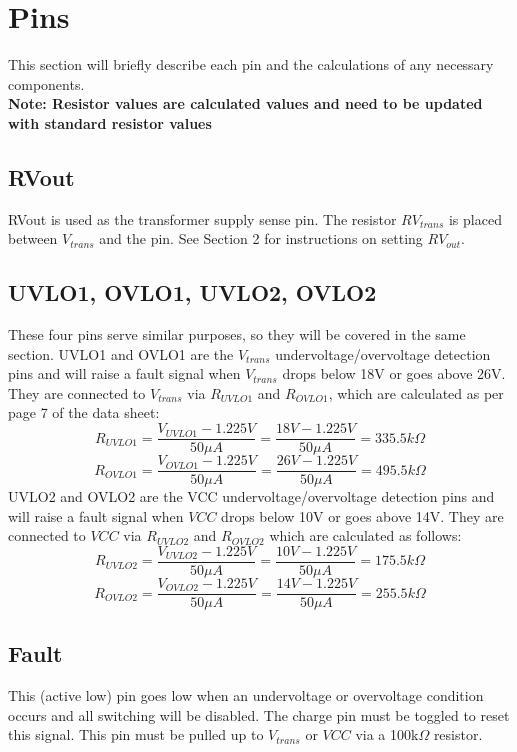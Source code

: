 \documentclass{article}
\begin{document}
	\section{Pins}
	This section will briefly describe each pin and the calculations of any necessary components.\\
	
	\noindent \textbf{Note: Resistor values are calculated values and need to be updated with standard resistor values}
	
	\subsection{RVout}
	RVout is used as the transformer supply sense pin. The resistor $RV_{trans}$ is placed between $V_{trans}$ and the pin. See Section 2 for instructions on setting $RV_{out}$.
	
	\subsection{UVLO1, OVLO1, UVLO2, OVLO2}
	These four pins serve similar purposes, so they will be covered in the same section. UVLO1 and OVLO1 are the $V_{trans}$ undervoltage/overvoltage detection pins and will raise a fault signal when $V_{trans}$ drops below 18V or goes above 26V. They are connected to $V_{trans}$ via $R_{UVLO1}$ and $R_{OVLO1}$, which are calculated as per page 7 of the data sheet:
	\[R_{UVLO1} = \dfrac{V_{UVLO1} - 1.225V}{50\mu A} = \dfrac{18V - 1.225V}{50\mu A} = 335.5k\Omega\]
	\[R_{OVLO1} = \dfrac{V_{OVLO1} - 1.225V}{50\mu A} = \dfrac{26V - 1.225V}{50\mu A} = 495.5k\Omega\]
	UVLO2 and OVLO2 are the VCC undervoltage/overvoltage detection pins and will raise a fault signal when $VCC$ drops below 10V or goes above 14V. They are connected to $VCC$ via $R_{UVLO2}$ and $R_{OVLO2}$ which are calculated as follows:
	\[R_{UVLO2} = \dfrac{V_{UVLO2} - 1.225V}{50\mu A} = \dfrac{10V - 1.225V}{50\mu A} = 175.5k\Omega\]
	\[R_{OVLO2} = \dfrac{V_{OVLO2} - 1.225V}{50\mu A} = \dfrac{14V - 1.225V}{50\mu A} = 255.5k\Omega\]
	
	\subsection{Fault}
	This (active low) pin goes low when an undervoltage or overvoltage condition occurs and all switching will be disabled. The charge pin must be toggled to reset this signal. This pin must be pulled up to $V_{trans}$ or $VCC$ via a 100k$\Omega$ resistor.
	
\end{document}
